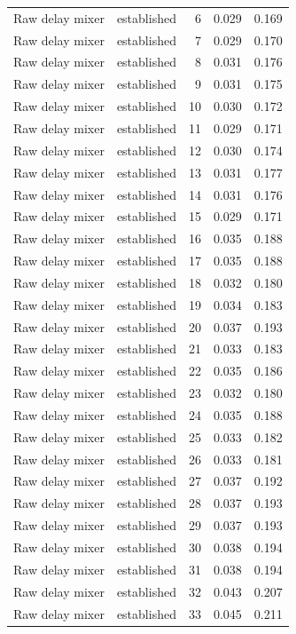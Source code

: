 \begin{tabular}{llrrr}
Raw delay mixer & established & 6 & 0.029 & 0.169 \\
Raw delay mixer & established & 7 & 0.029 & 0.170 \\
Raw delay mixer & established & 8 & 0.031 & 0.176 \\
Raw delay mixer & established & 9 & 0.031 & 0.175 \\
Raw delay mixer & established & 10 & 0.030 & 0.172 \\
Raw delay mixer & established & 11 & 0.029 & 0.171 \\
Raw delay mixer & established & 12 & 0.030 & 0.174 \\
Raw delay mixer & established & 13 & 0.031 & 0.177 \\
Raw delay mixer & established & 14 & 0.031 & 0.176 \\
Raw delay mixer & established & 15 & 0.029 & 0.171 \\
Raw delay mixer & established & 16 & 0.035 & 0.188 \\
Raw delay mixer & established & 17 & 0.035 & 0.188 \\
Raw delay mixer & established & 18 & 0.032 & 0.180 \\
Raw delay mixer & established & 19 & 0.034 & 0.183 \\
Raw delay mixer & established & 20 & 0.037 & 0.193 \\
Raw delay mixer & established & 21 & 0.033 & 0.183 \\
Raw delay mixer & established & 22 & 0.035 & 0.186 \\
Raw delay mixer & established & 23 & 0.032 & 0.180 \\
Raw delay mixer & established & 24 & 0.035 & 0.188 \\
Raw delay mixer & established & 25 & 0.033 & 0.182 \\
Raw delay mixer & established & 26 & 0.033 & 0.181 \\
Raw delay mixer & established & 27 & 0.037 & 0.192 \\
Raw delay mixer & established & 28 & 0.037 & 0.193 \\
Raw delay mixer & established & 29 & 0.037 & 0.193 \\
Raw delay mixer & established & 30 & 0.038 & 0.194 \\
Raw delay mixer & established & 31 & 0.038 & 0.194 \\
Raw delay mixer & established & 32 & 0.043 & 0.207 \\
Raw delay mixer & established & 33 & 0.045 & 0.211 \\

\end{tabular}
